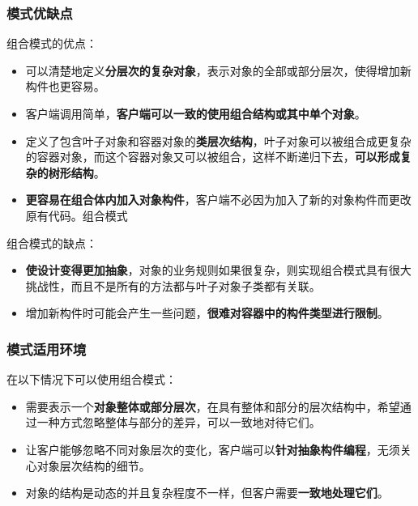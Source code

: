 \subsubsection{模式优缺点}
组合模式的优点：
\begin{itemize}
    \item 可以清楚地定义\textbf{分层次的复杂对象}，表示对象的全部或部分层次，使得增加新构件也更容易。
    \item 客户端调用简单，\textbf{客户端可以一致的使用组合结构或其中单个对象}。
    \item 定义了包含叶子对象和容器对象的\textbf{类层次结构}，叶子对象可以被组合成更复杂的容器对象，而这个容器对象又可以被组合，这样不断递归下去，\textbf{可以形成复杂的树形结构}。
    \item \textbf{更容易在组合体内加入对象构件}，客户端不必因为加入了新的对象构件而更改原有代码。组合模式
\end{itemize}

组合模式的缺点：
\begin{itemize}
    \item \textbf{使设计变得更加抽象}，对象的业务规则如果很复杂，则实现组合模式具有很大挑战性，而且不是所有的方法都与叶子对象子类都有关联。
    \item 增加新构件时可能会产生一些问题，\textbf{很难对容器中的构件类型进行限制}。
\end{itemize}

\subsubsection{模式适用环境}
在以下情况下可以使用组合模式：
\begin{itemize}
    \item 需要表示一个\textbf{对象整体或部分层次}，在具有整体和部分的层次结构中，希望通过一种方式忽略整体与部分的差异，可以一致地对待它们。
    \item 让客户能够忽略不同对象层次的变化，客户端可以\textbf{针对抽象构件编程}，无须关心对象层次结构的细节。
    \item 对象的结构是动态的并且复杂程度不一样，但客户需要\textbf{一致地处理它们}。
\end{itemize}

